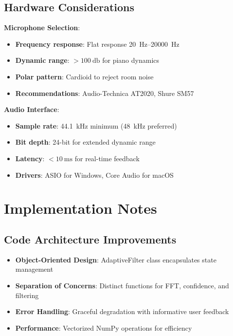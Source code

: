 \documentclass[11pt,a4paper]{article}
\begin{document}
\subsection{Hardware Considerations}

\textbf{Microphone Selection}:
\begin{itemize}
    \item \textbf{Frequency response}: Flat response \SIrange{20}{20000}{\hertz}
    \item \textbf{Dynamic range}: $>\SI{100}{\decibel}$ for piano dynamics
    \item \textbf{Polar pattern}: Cardioid to reject room noise
    \item \textbf{Recommendations}: Audio-Technica AT2020, Shure SM57
\end{itemize}

\textbf{Audio Interface}:
\begin{itemize}
    \item \textbf{Sample rate}: \SI{44.1}{\kilo\hertz} minimum (\SI{48}{\kilo\hertz} preferred)
    \item \textbf{Bit depth}: 24-bit for extended dynamic range
    \item \textbf{Latency}: $<\SI{10}{\milli\second}$ for real-time feedback
    \item \textbf{Drivers}: ASIO for Windows, Core Audio for macOS
\end{itemize}

\section{Implementation Notes}

\subsection{Code Architecture Improvements}
\begin{itemize}
    \item \textbf{Object-Oriented Design}: AdaptiveFilter class encapsulates state management
    \item \textbf{Separation of Concerns}: Distinct functions for FFT, confidence, and filtering
    \item \textbf{Error Handling}: Graceful degradation with informative user feedback
    \item \textbf{Performance}: Vectorized NumPy operations for efficiency
\end{itemize}
\end{document}
